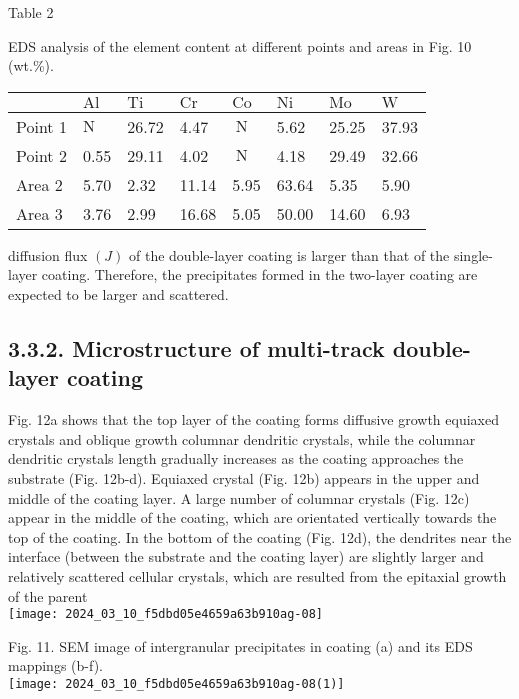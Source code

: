 \documentclass[10pt]{article}
\begin{document}
Table 2

EDS analysis of the element content at different points and areas in Fig. 10 (wt.\%).

\begin{center}
\begin{tabular}{llllllll}
\hline
 & $\mathrm{Al}$ & $\mathrm{Ti}$ & $\mathrm{Cr}$ & $\mathrm{Co}$ & $\mathrm{Ni}$ & $\mathrm{Mo}$ & $\mathrm{W}$ \\
\hline
Point 1 & $\mathrm{N}$ & 26.72 & 4.47 & $\mathrm{~N}$ & 5.62 & 25.25 & 37.93 \\
Point 2 & 0.55 & 29.11 & 4.02 & $\mathrm{~N}$ & 4.18 & 29.49 & 32.66 \\
Area 2 & 5.70 & 2.32 & 11.14 & 5.95 & 63.64 & 5.35 & 5.90 \\
Area 3 & 3.76 & 2.99 & 16.68 & 5.05 & 50.00 & 14.60 & 6.93 \\
\hline
\end{tabular}
\end{center}

diffusion flux $(J)$ of the double-layer coating is larger than that of the single-layer coating. Therefore, the precipitates formed in the two-layer coating are expected to be larger and scattered.

\subsection*{3.3.2. Microstructure of multi-track double-layer coating}
Fig. 12a shows that the top layer of the coating forms diffusive growth equiaxed crystals and oblique growth columnar dendritic crystals, while the columnar dendritic crystals length gradually increases as the coating approaches the substrate (Fig. 12b-d). Equiaxed crystal (Fig. 12b) appears in the upper and middle of the coating layer. A large number of columnar crystals (Fig. 12c) appear in the middle of the coating, which are orientated vertically towards the top of the coating. In the bottom of the coating (Fig. 12d), the dendrites near the interface (between the substrate and the coating layer) are slightly larger and relatively scattered cellular crystals, which are resulted from the epitaxial growth of the parent\\
\texttt{[image: 2024\_03\_10\_f5dbd05e4659a63b910ag-08]}

Fig. 11. SEM image of intergranular precipitates in coating (a) and its EDS mappings (b-f).\\
\texttt{[image: 2024\_03\_10\_f5dbd05e4659a63b910ag-08(1)]}
\end{document}
